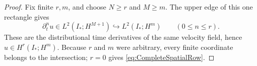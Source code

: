 \begin{proof}
Fix finite \(r,m\), and choose \(N\geq r\) and \(M\geq m\).
The upper edge of this one rectangle gives
\[
  \partial_t^nu\in L^2(I_*;H^{M+1})
  \hookrightarrow L^2(I_*;H^m)
  \qquad(0\leq n\leq r).
\]
These are the distributional time derivatives of the same velocity field, hence \(u\in H^r(I_*;H^m)\).
Because \(r\) and \(m\) were arbitrary, every finite coordinate belongs to the intersection; \(r=0\) gives \eqref{eq:CompleteSpatialRow}.
\end{proof}
